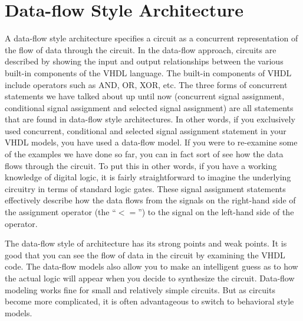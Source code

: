 \section{Data-flow Style Architecture}
A data-flow style architecture specifies a circuit as a concurrent representation of the flow of data through the circuit. In the data-flow approach, circuits are described by showing the input and output relationships between the various built-in components of the VHDL language. The built-in components of VHDL include operators such as AND, OR, XOR, etc. The three forms of concurrent statements we have talked about up until now (concurrent signal assignment, conditional signal assignment and selected signal assignment) are all statements that are found in data-flow style architectures. In other words, if you exclusively used concurrent, conditional and selected signal assignment statement in your VHDL models, you have used a data-flow model. If you were to re-examine some of the examples we have done so far, you can in fact sort of see how the data flows through the circuit. To put this in other words, if you have a working knowledge of digital logic, it is fairly straightforward to imagine the underlying circuitry in terms of standard logic gates. These signal assignment statements effectively describe how the data flows from the signals on the right-hand side of the assignment operator (the ``{\footnotesize$<=$}'') to the signal on the left-hand side of the operator.

The data-flow style of architecture has its strong points and weak points. It is good that you can see the flow of data in the circuit by examining the VHDL code. The data-flow models also allow you to make an intelligent guess as to how the actual logic will appear when you decide to synthesize the circuit. Data-flow modeling works fine for small and relatively simple circuits. But as circuits become more complicated, it is often advantageous to switch to behavioral style models.

